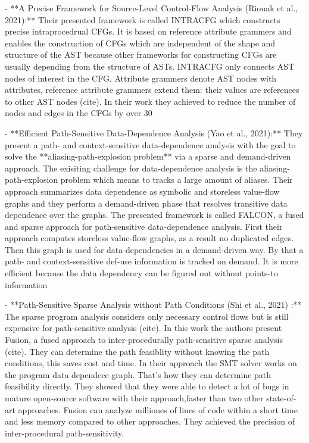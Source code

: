 - **A Precise Framework for Source-Level Control-Flow Analysis (Riouak et al., 2021):** Their presented framework is called INTRACFG which constructs precise intraprocedrual CFGs. It is based on reference 
attribute grammers and enables the construction of CFGs which are independent of the shape and structure of the AST because other frameworks for constructing CFGs are usually depending from the structure of ASTs. 
INTRACFG only connects AST nodes of interest in the CFG. Attribute grammers denote AST nodes with attributes, reference attribute grammers extend them: their values are references to other AST nodes (cite). 
In their work they achieved to reduce the number of nodes and edges in the CFGs by over 30%

- **Efficient Path-Sensitive Data-Dependence Analysis (Yao et al., 2021):** They present a path- and context-sensitive data-dependence analysis with the goal to solve the **aliasing-path-explosion problem**
via a sparse and demand-driven approach. The exisiting challenge for data-dependence analysis is the aliasing-path-explosion problem which means to tracks a large amount of aliases. Their approach summarizes 
data dependence as symbolic and storeless value-flow graphs and they perform a demand-driven phase that resolves transitive data dependence over the graphs. The presented framework is called FALCON, a fused and 
sparse approach for path-sensitive data-dependence analysis. First their approach computes storeless value-flow graphs, as a result no duplicated edges. Then this graph is used for data-dependencies in a 
demand-driven way. By that a path- and context-sensitive def-use information is tracked on demand. It is more efficient because the data dependency can be figured out without points-to information 

- **Path-Sensitive Sparse Analysis without Path Conditions (Shi et al., 2021) :** The sparse program analysis considers only necessary control flows but is still expensive for path-sensitive analysis (cite). 
In this work the authors present Fusion, a fused approach to inter-procedurally path-sensitive sparse analysis (cite). They can determine the path feasiblity without knowing the path conditions, 
this saves cost and time. In their approach the SMT solver works on the program data dependece graph. That's how they can determine path feasibility directly.
They showed that they were able to detect a lot of bugs in mature open-source software with their approach,faster than two other state-of-art approaches. Fusion can analyze milliones of lines of code within a 
short time and less memory compared to other approaches. They achieved the precision of inter-procedural path-sensitivity.
